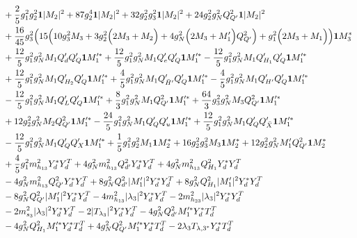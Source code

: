 {\begin{align}
 &+\frac{2}{5} g_{1}^{2} g_{2}^{2} {\bf 1} |M_2|^2 +87 g_{2}^{4} {\bf 1} |M_2|^2 +32 g_{2}^{2} g_{3}^{2} {\bf 1} |M_2|^2 +24 g_{2}^{2} g_{N}^{2} Q_{Q'}^{2} {\bf 1} |M_2|^2 \nonumber \\ 
 &+\frac{16}{45} g_{3}^{2} \Big(15 \Big(10 g_{3}^{2} M_3  + 3 g_{2}^{2} \Big(2 M_3  + M_2\Big) + 4 g_{N}^{2} \Big(2 M_3  + M_1'\Big)Q_{Q'}^{2} \Big) + g_{1}^{2} \Big(2 M_3  + M_1\Big)\Big){\bf 1} M_3^* \nonumber \\ 
 &+\frac{12}{5} g_{1}^{2} g_{N}^{2} M_1 Q_d' Q_Q' {\bf 1} M_1'^* +\frac{12}{5} g_{1}^{2} g_{N}^{2} M_1 Q_e' Q_Q' {\bf 1} M_1'^* -\frac{12}{5} g_{1}^{2} g_{N}^{2} M_1 Q_{H_1}' Q_Q' {\bf 1} M_1'^* \nonumber \\ 
 &+\frac{12}{5} g_{1}^{2} g_{N}^{2} M_1 Q_{H_2}' Q_Q' {\bf 1} M_1'^* +\frac{4}{5} g_{1}^{2} g_{N}^{2} M_1 Q_{\bar{H}'}' Q_Q' {\bf 1} M_1'^* -\frac{4}{5} g_{1}^{2} g_{N}^{2} M_1 Q_{H'}' Q_Q' {\bf 1} M_1'^* \nonumber \\ 
 &-\frac{12}{5} g_{1}^{2} g_{N}^{2} M_1 Q_L' Q_Q' {\bf 1} M_1'^* +\frac{8}{3} g_{1}^{2} g_{N}^{2} M_1 Q_{Q'}^{2} {\bf 1} M_1'^* +\frac{64}{3} g_{3}^{2} g_{N}^{2} M_3 Q_{Q'}^{2} {\bf 1} M_1'^* \nonumber \\ 
 &+12 g_{2}^{2} g_{N}^{2} M_2 Q_{Q'}^{2} {\bf 1} M_1'^* -\frac{24}{5} g_{1}^{2} g_{N}^{2} M_1 Q_Q' Q_u' {\bf 1} M_1'^* +\frac{12}{5} g_{1}^{2} g_{N}^{2} M_1 Q_Q' Q_{\bar{X}}' {\bf 1} M_1'^* \nonumber \\ 
 &-\frac{12}{5} g_{1}^{2} g_{N}^{2} M_1 Q_Q' Q_X' {\bf 1} M_1'^* +\frac{1}{5} g_{1}^{2} g_{2}^{2} M_1 {\bf 1} M_2^* +16 g_{2}^{2} g_{3}^{2} M_3 {\bf 1} M_2^* +12 g_{2}^{2} g_{N}^{2} M_1' Q_{Q'}^{2} {\bf 1} M_2^* \nonumber \\ 
 &+\frac{4}{5} g_{1}^{2} m_{h_{13}}^2 {Y_d^*  Y_{d}^{T}} +4 g_{N}^{2} m_{h_{13}}^2 Q_{d'}^{2} {Y_d^*  Y_{d}^{T}} +4 g_{N}^{2} m_{h_{13}}^2 Q_{H_1}^{2} {Y_d^*  Y_{d}^{T}} \nonumber \\ 
 &-4 g_{N}^{2} m_{h_{13}}^2 Q_{Q'}^{2} {Y_d^*  Y_{d}^{T}} +8 g_{N}^{2} Q_{d'}^{2} |M_1'|^2 {Y_d^*  Y_{d}^{T}} +8 g_{N}^{2} Q_{H_1}^{2} |M_1'|^2 {Y_d^*  Y_{d}^{T}} \nonumber \\ 
 &-8 g_{N}^{2} Q_{Q'}^{2} |M_1'|^2 {Y_d^*  Y_{d}^{T}} -4 m_{h_{13}}^2 |\lambda_3|^2 {Y_d^*  Y_{d}^{T}} -2 m_{h_{23}}^2 |\lambda_3|^2 {Y_d^*  Y_{d}^{T}} \nonumber \\ 
 &-2 m_{s_3}^2 |\lambda_3|^2 {Y_d^*  Y_{d}^{T}} -2 |T_{\lambda_3}|^2 {Y_d^*  Y_{d}^{T}} -4 g_{N}^{2} Q_{d'}^{2} M_1'^* {Y_d^*  T_{d}^{T}} \nonumber \\ 
 &-4 g_{N}^{2} Q_{H_1}^{2} M_1'^* {Y_d^*  T_{d}^{T}} +4 g_{N}^{2} Q_{Q'}^{2} M_1'^* {Y_d^*  T_{d}^{T}} -2 \lambda_3 T_{{\lambda,3}^*} {Y_d^*  T_{d}^{T}} \nonumber \\ 

\end{align}}
